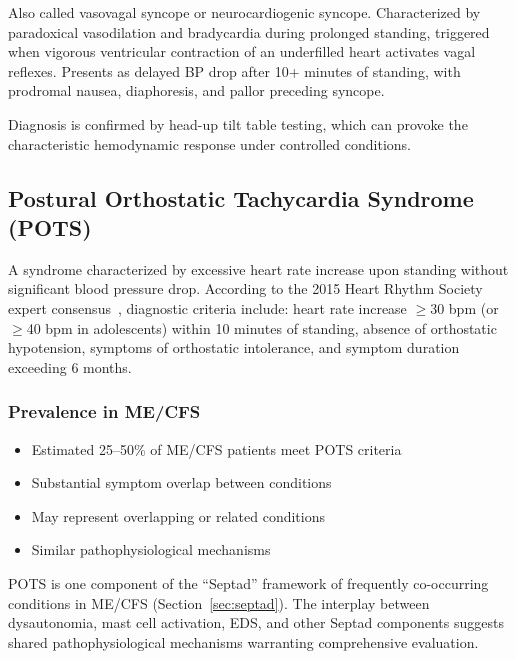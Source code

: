 \begin{definition}
Also called vasovagal syncope or neurocardiogenic syncope. Characterized by paradoxical vasodilation and bradycardia during prolonged standing, triggered when vigorous ventricular contraction of an underfilled heart activates vagal reflexes. Presents as delayed BP drop after 10+ minutes of standing, with prodromal nausea, diaphoresis, and pallor preceding syncope.
\end{definition}

Diagnosis is confirmed by head-up tilt table testing, which can provoke the characteristic hemodynamic response under controlled conditions.

\subsection{Postural Orthostatic Tachycardia Syndrome (POTS)}
\label{sec:pots}

\begin{definition}
A syndrome characterized by excessive heart rate increase upon standing without significant blood pressure drop. According to the 2015 Heart Rhythm Society expert consensus~\cite{Sheldon2015POTScriteria}, diagnostic criteria include: heart rate increase $\geq$30 bpm (or $\geq$40 bpm in adolescents) within 10 minutes of standing, absence of orthostatic hypotension, symptoms of orthostatic intolerance, and symptom duration exceeding 6 months.
\end{definition}

\subsubsection{Prevalence in ME/CFS}
\begin{itemize}
    \item Estimated 25--50\% of ME/CFS patients meet POTS criteria~\cite{Newton2008POTSprevalence}
    \item Substantial symptom overlap between conditions
    \item May represent overlapping or related conditions
    \item Similar pathophysiological mechanisms
\end{itemize}

POTS is one component of the ``Septad'' framework of frequently co-occurring conditions in ME/CFS (Section~\ref{sec:septad}). The interplay between dysautonomia, mast cell activation, EDS, and other Septad components suggests shared pathophysiological mechanisms warranting comprehensive evaluation.

